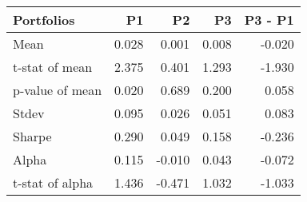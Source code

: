 \begin{tabular}{lrrrr}
\toprule
Portfolios & P1 & P2 & P3 & P3 - P1 \\
\midrule
Mean & 0.028 & 0.001 & 0.008 & -0.020 \\
t-stat of mean & 2.375 & 0.401 & 1.293 & -1.930 \\
p-value of mean & 0.020 & 0.689 & 0.200 & 0.058 \\
Stdev & 0.095 & 0.026 & 0.051 & 0.083 \\
Sharpe & 0.290 & 0.049 & 0.158 & -0.236 \\
Alpha & 0.115 & -0.010 & 0.043 & -0.072 \\
t-stat of alpha & 1.436 & -0.471 & 1.032 & -1.033 \\
\bottomrule
\end{tabular}
